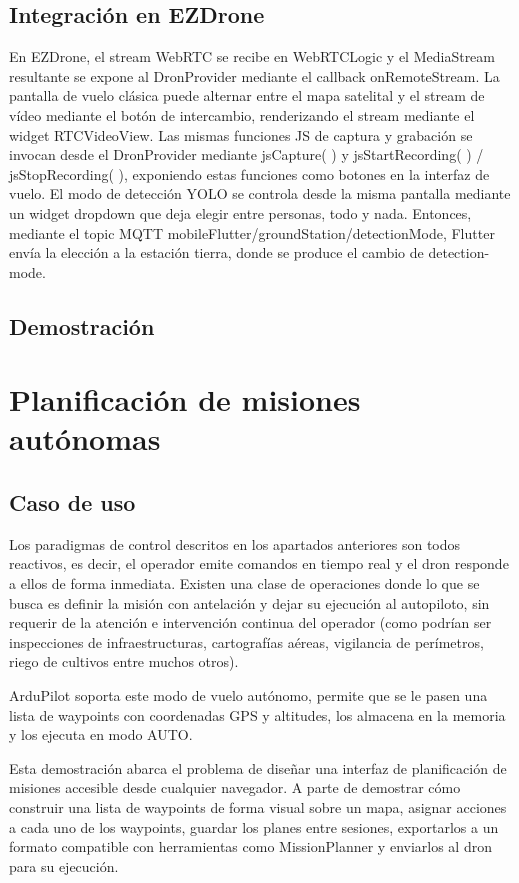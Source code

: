\subsection{Integración en EZDrone}
En EZDrone, el stream WebRTC se recibe en WebRTCLogic y el MediaStream resultante se expone al DronProvider mediante el callback onRemoteStream. La pantalla de vuelo clásica puede alternar entre el mapa satelital y el stream de vídeo mediante el botón de intercambio, renderizando el stream mediante el widget RTCVideoView. Las mismas funciones JS de captura y grabación se invocan desde el DronProvider mediante jsCapture( ) y jsStartRecording( ) / jsStopRecording( ), exponiendo estas funciones como botones en la interfaz de vuelo. El modo de detección YOLO se controla desde la misma pantalla mediante un widget dropdown que deja elegir entre personas, todo y nada. Entonces, mediante el topic MQTT mobileFlutter/groundStation/detectionMode, Flutter envía la elección a la estación tierra, donde se produce el cambio de detection-mode.

\subsection{Demostración}

\section{Planificación de misiones autónomas}

\subsection{Caso de uso}
Los paradigmas de control descritos en los apartados anteriores son todos reactivos, es decir, el operador emite comandos en tiempo real y el dron responde a ellos de forma inmediata. Existen una clase de operaciones donde lo que se busca es definir la misión con antelación y dejar su ejecución al autopiloto, sin requerir de la atención e intervención continua del operador (como podrían ser inspecciones de infraestructuras, cartografías aéreas, vigilancia de perímetros, riego de cultivos entre muchos otros).

ArduPilot soporta este modo de vuelo autónomo, permite que se le pasen una lista de waypoints con coordenadas GPS y altitudes, los almacena en la memoria y los ejecuta en modo AUTO.

Esta demostración abarca el problema de diseñar una interfaz de planificación de misiones accesible desde cualquier navegador. A parte de demostrar cómo construir una lista de waypoints de forma visual sobre un mapa, asignar acciones a cada uno de los waypoints, guardar los planes entre sesiones, exportarlos a un formato compatible con herramientas como MissionPlanner y enviarlos al dron para su ejecución.

